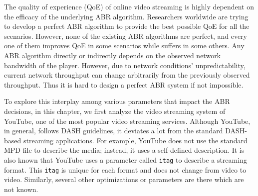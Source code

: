 
The quality of experience (QoE) of online video streaming is highly dependent on the efficacy of the underlying ABR algorithm. Researchers worldwide are trying to develop a perfect ABR algorithm to provide the best possible QoE for all the scenarios. However, none of the existing ABR algorithms are perfect, and every one of them improves QoE in some scenarios while suffers in some others. Any ABR algorithm directly or indirectly depends on the observed network bandwidth of the player. However, due to network conditions' unpredictability, current network throughput can change arbitrarily from the previously observed throughput. Thus it is hard to design a perfect ABR system if not impossible. 

To explore this interplay among various parameters that impact the ABR decisions, in this chapter, we first analyze the video streaming system of YouTube, one of the most popular video streaming services. Although YouTube, in general, follows DASH guidelines, it deviates a lot from the standard DASH-based streaming applications. For example, YouTube does not use the standard MPD file to describe the media; instead, it uses a self-defined description. It is also known that YouTube uses a parameter called {\tt itag} to describe a streaming format. This {\tt itag} is unique for each format and does not change from video to video. Similarly, several other optimizations or parameters are there which are not known. 

